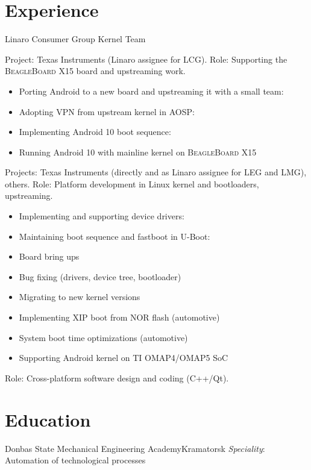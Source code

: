\documentclass[11pt,a4paper]{moderncv}
\begin{document}
\section{Experience}
  {Linaro Consumer Group Kernel Team}
  {Project: Texas Instruments (Linaro assignee for LCG). \newline{}
   Role: Supporting the \textsc{BeagleBoard X15} board and upstreaming work.
   \begin{itemize}
     \item Porting Android to a new board and upstreaming it with a small team:
           \cite{a}
     \item Adopting VPN from upstream kernel in AOSP: \cite{b}
     \item Implementing Android 10 boot sequence: \cite{c}
     \item Running Android 10 with mainline kernel on \textsc{BeagleBoard X15}
   \end{itemize}}
  {Projects: Texas Instruments (directly and as Linaro assignee for LEG and
   LMG), others. \newline{}
   Role: Platform development in Linux kernel and bootloaders, upstreaming.
   \begin{itemize}
     \item Implementing and supporting device drivers: \cite{d}
     \item Maintaining boot sequence and fastboot in U-Boot: \cite{e}
     \item Board bring ups
     \item Bug fixing (drivers, device tree, bootloader)
     \item Migrating to new kernel versions
     \item Implementing XIP boot from NOR flash (automotive)
     \item System boot time optimizations (automotive)
     \item Supporting Android kernel on TI OMAP4/OMAP5 SoC
   \end{itemize}
  }
  {Role: Cross-platform software design and coding (C++/Qt).}

\section{Education}
  {Donbas State Mechanical Engineering Academy}{Kramatorsk}{}
  {\textit{Speciality}: Automation of technological processes}
\end{document}

